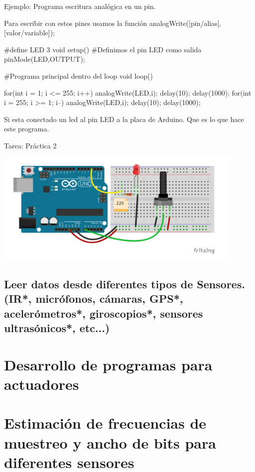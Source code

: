\documentclass{beamer}
\begin{document}
\begin{frame}[fragile]Ejemplo: Programa escritura analógica en un pin.

Para escribir con estos pines usamos la funci\'{o}n analogWrite([pin/alias],[valor/variable]);

\tiny
\begin{verbatimtab}

#define LED 3
void setup() {
	#Definimos el pin LED como salida 
 	pinMode(LED,OUTPUT); 
}

#Programa principal dentro del loop
void loop() {
	
  for(int i = 1; i <= 255; i++){
    analogWrite(LED,i);
    delay(10);
    }
    delay(1000);
  for(int i = 255; i >= 1; i--){
    analogWrite(LED,i);
    delay(10);
    }
  delay(1000);
}
\end{verbatimtab}

Si esta conectado un led al pin LED a la placa de Arduino. Que es lo que hace este programa.



\end{frame}


\begin{frame}{Tarea: Práctica 2}

\includegraphics[width=0.9\textwidth]{figures/tarea2.png}

\end{frame}




\subsection{Leer datos desde diferentes tipos de Sensores.  (IR*, micrófonos, cámaras, GPS*, acelerómetros*, giroscopios*, sensores ultrasónicos*, etc...)}

\section{Desarrollo de programas para actuadores}

\begin{frame}

\end{frame}

\section{Estimación de frecuencias de muestreo y ancho de bits para diferentes sensores}

\begin{frame}

\end{frame}
\end{document}
